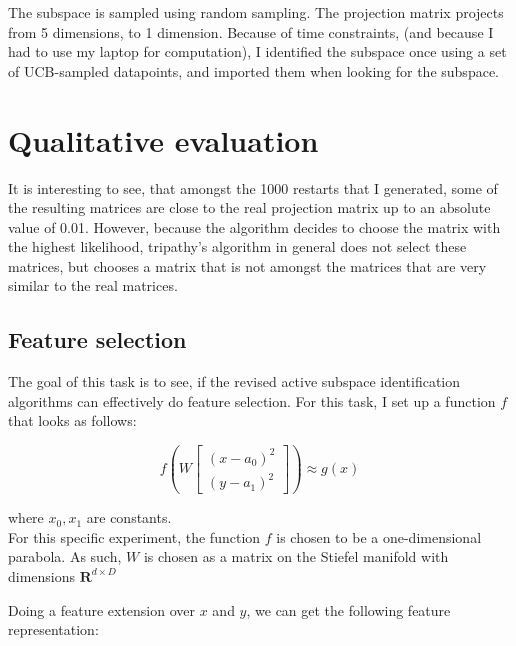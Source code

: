 The subspace is sampled using random sampling.
The projection matrix projects from 5 dimensions, to 1 dimension. 
Because of time constraints, (and because I had to use my laptop for computation), I identified the subspace once using a set of UCB-sampled datapoints, and imported them when looking for the subspace.


\section{Qualitative evaluation}
It is interesting to see, that amongst the 1000 restarts that I generated, some of the resulting matrices are close to the real projection matrix up to an absolute value of 0.01.
However, because the algorithm decides to choose the matrix with the highest likelihood, tripathy's algorithm in general does not select these matrices, but chooses a matrix that is not amongst the matrices that are very similar to the real matrices.

\subsection{Feature selection}
The goal of this task is to see, if the revised active subspace identification algorithms can effectively do feature selection.
For this task, I set up a function $ f $ that looks as follows:

\def\B{
\begin{bmatrix}
    (x - a_0)^2 \\
    (y - a_1)^2
\end{bmatrix}}

\begin{equation} \label{eq:FeatureExtension}
f \left( W \B \right) \approx g \left( x \right)
\end{equation} 

where $x_0, x_1$ are constants. \\

For this specific experiment, the function $f$ is chosen to be a one-dimensional parabola. 
As such, $W$ is chosen as a matrix on the Stiefel manifold with dimensions $\mathbf{R}^{d \times D}$

Doing a feature extension over $x$ and $y$, we can get the following feature representation:

\def\PHI{
\begin{bmatrix}
	x_0^2 \\
	x_1^2 \\
	x_0 \\
	x_1 \\
    1
\end{bmatrix}}


